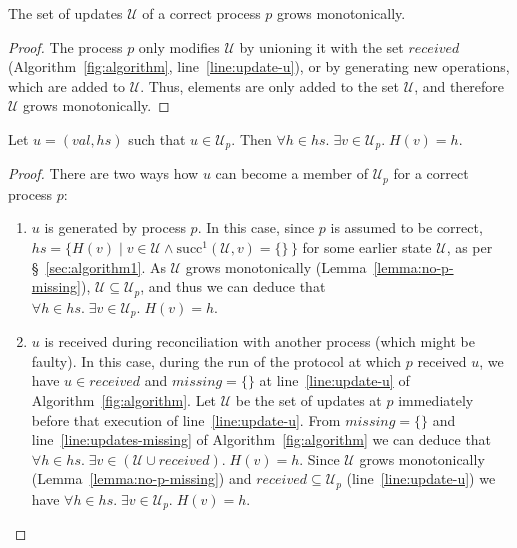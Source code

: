\documentclass[a4paper,anonymous,USenglish]{lipics-v2019}
\begin{document}
\begin{lemma}\label{lemma:no-p-missing}
The set of updates $\mathcal{U}$ of a correct process $p$ grows monotonically.
\end{lemma}
\begin{proof}
The process $p$ only modifies $\mathcal{U}$ by unioning it with the set $\mathit{received}$ (Algorithm~\ref{fig:algorithm}, line~\ref{line:update-u}), or by generating new operations, which are added to $\mathcal{U}$.
Thus, elements are only added to the set $\mathcal{U}$, and therefore $\mathcal{U}$ grows monotonically.
\end{proof}

\begin{lemma}\label{lemma:no-dangling}
Let $u = (\mathit{val}, \mathit{hs})$ such that $u \in \mathcal{U}_p$.
Then $\forall h \in \mathit{hs}.\; \exists v \in \mathcal{U}_p.\; H(v) = h$.
\end{lemma}
\begin{proof}
There are two ways how $u$ can become a member of $\mathcal{U}_p$ for a correct process $p$:
\begin{enumerate}
    \item $u$ is generated by process $p$.
    In this case, since $p$ is assumed to be correct, $\mathit{hs} = \{H(v) \mid v \in \mathcal{U} \wedge \mathrm{succ}^1(\mathcal{U}, v) = \{\}\,\}$ for some earlier state $\mathcal{U}$, as per \S~\ref{sec:algorithm1}.
    As $\mathcal{U}$ grows monotonically (Lemma~\ref{lemma:no-p-missing}), $\mathcal{U} \subseteq \mathcal{U}_p$, and thus we can deduce that $\forall h \in \mathit{hs}.\; \exists v \in \mathcal{U}_p.\; H(v) = h$.
    \item $u$ is received during reconciliation with another process (which might be faulty).
    In this case, during the run of the protocol at which $p$ received $u$, we have $u \in \mathit{received}$ and $\mathit{missing} = \{\}$ at line~\ref{line:update-u} of Algorithm~\ref{fig:algorithm}.
    Let $\mathcal{U}$ be the set of updates at $p$ immediately before that execution of line~\ref{line:update-u}.
    From $\mathit{missing} = \{\}$ and line~\ref{line:updates-missing} of Algorithm~\ref{fig:algorithm} we can deduce that $\forall h \in \mathit{hs}.\; \exists v \in (\mathcal{U} \cup \mathit{received}).\; H(v) = h$.
    Since $\mathcal{U}$ grows monotonically (Lemma~\ref{lemma:no-p-missing}) and $\mathit{received} \subseteq \mathcal{U}_p$ (line~\ref{line:update-u}) we have $\forall h \in \mathit{hs}.\; \exists v \in \mathcal{U}_p.\; H(v) = h$.
\end{enumerate}
\end{proof}
\end{document}
